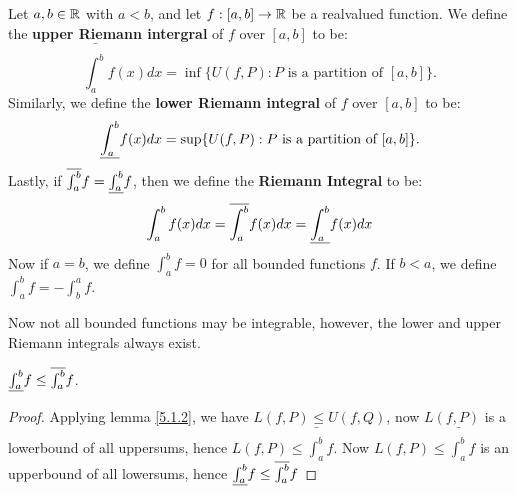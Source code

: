 \begin{definition}		
    Let $a,b \in \mathbb{R}$ with  $a<b$, and let  $f:[a,b] \rightarrow \mathbb{R}$ be a realvalued function.
    We define the \textbf{upper Riemann intergral} of $f$ over  $[a,b]$ to be:
        \begin{equation}
            \bar{\int_{a}^{b}}{f(x) dx}=\inf\{U(f,P):P \text{ is a partition of } [a,b]\}. 
        \end{equation}
    Similarly, we define the \textbf{lower Riemann integral} of $f$ over  $[a,b]$ to be:
        \begin{equation}
            \underline{\int_{a}^{b}}{f(x) dx}=\sup\{U(f,P):P \text{ is a partition of } [a,b]\}. 
        \end{equation} 
        Lastly, if $\overline{\int_{a}^{b}}{f}=\underline{\int_{a}^{b}}{f}$, then we define the \textbf{Riemann Integral} to be:
        \begin{equation}
            \int_{a}^{b}{f(x) dx}=\overline{\int_{a}^{b}}{f(x) dx}=\underline{\int_{a}^{b}}{f(x) dx}
        \end{equation}
        Now if $a=b$, we define  $\int_{a}^{b}{f}=0$ for all bounded functions  $f$. If $b<a$, we define  $\int_{a}^{b}{f}=-\int_{b}^{a}{f}$.
\end{definition}

Now not all bounded functions may be integrable, however, the lower and upper Riemann integrals always exist.

\begin{lemma}\label{1.5.4}
    $\underline{\int_{a}^{b}}{f} \leq \overline{\int_{a}^{b}}{f}$.
\end{lemma}
\begin{proof} 		
    Applying lemma \ref{5.1.2}, we have $L(f,P) \leq U(f,Q)$, now  $L(f,P)$ is a lowerbound of all uppersums, hence  $L(f,P) \leq \bar{\int_{a}^{b}}{f}$.
    Now $L(f,P) \leq \bar{\int_{a}^{b}}{f}$ is an upperbound of all lowersums, hence $\underline{\int_{a}^{b}}{f} \leq \overline{\int_{a}^{b}}{f}$
\end{proof}

